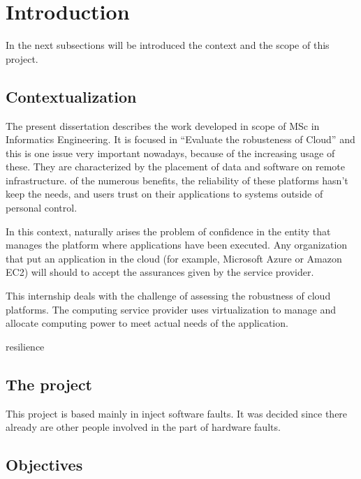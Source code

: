 \newpage
\section{Introduction}

In the next subsections will be introduced the context and the scope of this project.

\subsection{Contextualization}
The present dissertation describes the work developed in scope of MSc in Informatics Engineering. It is focused in ``Evaluate the robusteness of Cloud'' and this is one issue very important nowadays, because of the increasing usage of these.
They are characterized by the placement of data and software on remote infrastructure.  of the numerous benefits, the reliability of these platforms hasn't keep the needs, and users trust on their applications to systems outside of personal control.

In this context, naturally arises the problem of confidence in the entity that manages the platform where applications have been executed. Any organization that put an application in the cloud (for example, Microsoft Azure or Amazon EC2) will should to accept the assurances given by the service provider.

This internship deals with the challenge of assessing the robustness of cloud platforms. The computing service provider uses virtualization to manage and allocate computing power to meet actual needs of the application. 

resilience



\subsection{The project}

This project is based mainly in inject software faults. It was decided since there already are other people involved in the part of hardware faults.

\subsection{Objectives}

